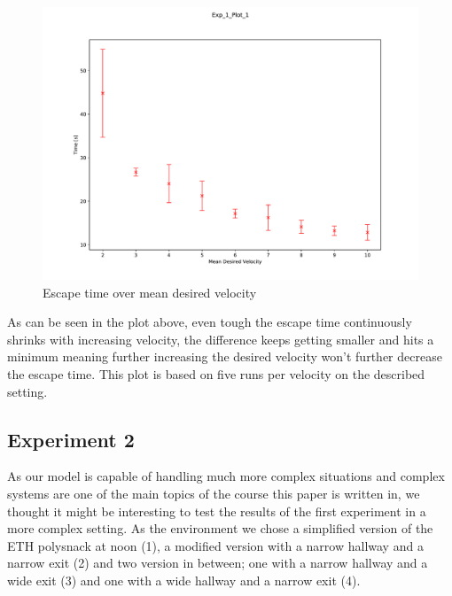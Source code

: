 \documentclass[11pt]{article}
\begin{document}
\begin{figure}[H]
	\centering
	\includegraphics[width=.75\linewidth]{assets/Exp_1_Plot_1}\\
	Escape time over mean desired velocity
\end{figure}

As can be seen in the plot above, even tough the escape time continuously shrinks with increasing velocity, the difference keeps getting smaller and hits a minimum meaning further increasing the desired velocity won't further decrease the escape time. This plot is based on five runs per velocity on the described setting.


\subsection{Experiment 2}

As our model is capable of handling much more complex situations and complex systems are one of the main topics of the course this paper is written in, we  thought it might be interesting to test the results of the first experiment in a more complex setting. As the environment we chose a simplified version of the ETH polysnack at noon (1), a modified version with a narrow hallway and a narrow exit (2) and two version in between; one with a narrow hallway and a wide exit (3) and one with a wide hallway and a narrow exit (4).
\end{document}
